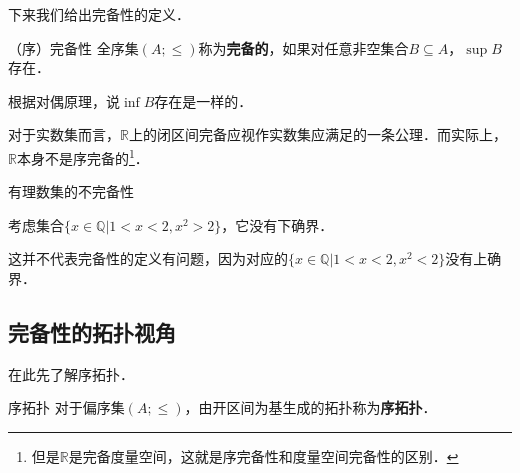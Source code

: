 下来我们给出完备性的定义．

\begin{definition}{（序）完备性}
全序集$(A;\leq)$称为\textbf{完备的}，如果对任意非空集合$B\subseteq A$，$\sup B$存在．
\end{definition}

根据对偶原理，说$\inf B$存在是一样的．

对于实数集而言，$\mathbb{R}$上的闭区间完备应视作实数集应满足的一条公理．而实际上，$\mathbb{R}$本身不是序完备的\footnote{但是$\mathbb{R}$是完备度量空间，这就是序完备性和度量空间完备性的区别．}．

\begin{example}{有理数集的不完备性}

考虑集合$\{x\in\mathbb{Q}|1<x<2,x^2>2\}$，它没有下确界．

这并不代表完备性的定义有问题，因为对应的$\{x\in\mathbb{Q}|1<x<2,x^2<2\}$没有上确界．
\end{example}

\subsection{完备性的拓扑视角}


在此先了解序拓扑．

\begin{definition}{序拓扑}
对于偏序集$(A;\leq)$，由开区间为基生成的拓扑称为\textbf{序拓扑}．
\end{definition}

